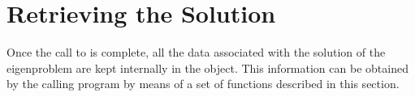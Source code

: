

\section{Retrieving the Solution}
\label{sec:retrsol}

Once the call to  is complete, all the data associated with the solution of the eigenproblem are kept internally in the  object. This information can be obtained by the calling program by means of a set of functions described in this section.

